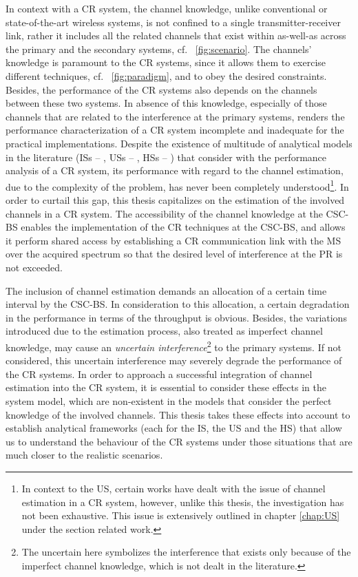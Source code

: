 In context with a CR system, the channel knowledge, unlike conventional or state-of-the-art wireless systems, is not confined to a single transmitter-receiver link, rather it includes all the related channels that exist within as-well-as across the primary and the secondary systems, cf. \figurename~\ref{fig:scenario}. The channels' knowledge is paramount to the CR systems, since it allows them to exercise different techniques, cf. \figurename~\ref{fig:paradigm}, and to obey the desired constraints. Besides, the performance of the CR systems also depends on the channels between these two systems. In absence of this knowledge, especially of those channels that are related to the interference at the primary systems, renders the performance characterization of a CR system incomplete and inadequate for the practical implementations. Despite the existence of multitude of analytical models in the literature (ISs -- \cite{Liang08, Sharma14, Pradhan15}, USs -- \cite{Xing07, Ghasemi07, Kang09}, HSs -- \cite{Song13, Gmira15, Jiang13, Fili15}) that consider with the performance analysis of a CR system, its performance with regard to the channel estimation, due to the complexity of the problem, has never been completely understood\footnote{In context to the US, certain works \cite{Musa09, Suraweera10, Kim12} have dealt with the issue of channel estimation in a CR system, however, unlike this thesis, the investigation has not been exhaustive. This issue is extensively outlined in chapter \ref{chap:US} under the section related work.}. In order to curtail this gap, this thesis capitalizes on the estimation of the involved channels in a CR system. The accessibility of the channel knowledge at the CSC-BS enables the implementation of the CR techniques at the CSC-BS, and allows it perform shared access by establishing a CR communication link with the MS over the acquired spectrum so that the desired level of interference at the PR is not exceeded. 


The inclusion of channel estimation demands an allocation of a certain time interval by the CSC-BS. In consideration to this allocation, a certain degradation in the performance in terms of the throughput is obvious. Besides, the variations introduced due to the estimation process, also treated as imperfect channel knowledge, may cause an \textit{uncertain interference}\footnote{The uncertain here symbolizes the interference that exists only because of the imperfect channel knowledge, which is not dealt in the literature.} to the primary systems. If not considered, this uncertain interference may severely degrade the performance of the CR systems. In order to approach a successful integration of channel estimation into the CR system, it is essential to consider these effects in the system model, which are non-existent in the models that consider the perfect knowledge of the involved channels. This thesis takes these effects into account to establish analytical frameworks (each for the IS, the US and the HS) that allow us to understand the behaviour of the CR systems under those situations that are much closer to the realistic scenarios. %

